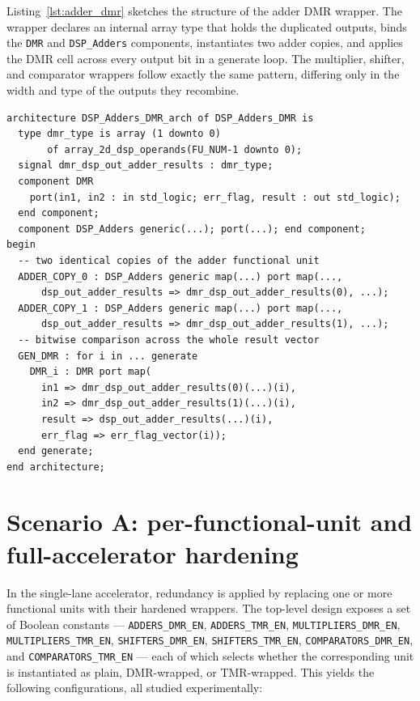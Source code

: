 Listing~\ref{lst:adder_dmr} sketches the structure of the adder DMR wrapper. The
wrapper declares an internal array type that holds the duplicated outputs, binds
the \texttt{DMR} and \texttt{DSP\_Adders} components, instantiates two adder
copies, and applies the DMR cell across every output bit in a generate loop. The
multiplier, shifter, and comparator wrappers follow exactly the same pattern,
differing only in the width and type of the outputs they recombine.

\begin{lstlisting}[language=myvhdl, caption={Structure of the adder DMR wrapper (abridged).}, label={lst:adder_dmr}]
architecture DSP_Adders_DMR_arch of DSP_Adders_DMR is
  type dmr_type is array (1 downto 0)
       of array_2d_dsp_operands(FU_NUM-1 downto 0);
  signal dmr_dsp_out_adder_results : dmr_type;
  component DMR
    port(in1, in2 : in std_logic; err_flag, result : out std_logic);
  end component;
  component DSP_Adders generic(...); port(...); end component;
begin
  -- two identical copies of the adder functional unit
  ADDER_COPY_0 : DSP_Adders generic map(...) port map(...,
      dsp_out_adder_results => dmr_dsp_out_adder_results(0), ...);
  ADDER_COPY_1 : DSP_Adders generic map(...) port map(...,
      dsp_out_adder_results => dmr_dsp_out_adder_results(1), ...);
  -- bitwise comparison across the whole result vector
  GEN_DMR : for i in ... generate
    DMR_i : DMR port map(
      in1 => dmr_dsp_out_adder_results(0)(...)(i),
      in2 => dmr_dsp_out_adder_results(1)(...)(i),
      result => dsp_out_adder_results(...)(i),
      err_flag => err_flag_vector(i));
  end generate;
end architecture;
\end{lstlisting}

\section{Scenario A: per-functional-unit and full-accelerator hardening}
\label{sec:ft-scenarioB}

In the single-lane accelerator, redundancy is applied by replacing one or more
functional units with their hardened wrappers. The top-level design exposes a
set of Boolean constants --- \texttt{ADDERS\_DMR\_EN}, \texttt{ADDERS\_TMR\_EN},
\texttt{MULTIPLIERS\_DMR\_EN}, \texttt{MULTIPLIERS\_TMR\_EN},
\texttt{SHIFTERS\_DMR\_EN}, \texttt{SHIFTERS\_TMR\_EN},
\texttt{COMPARATORS\_DMR\_EN}, and \texttt{COMPARATORS\_TMR\_EN} --- each of which
selects whether the corresponding unit is instantiated as plain, DMR-wrapped, or
TMR-wrapped. This yields the following configurations, all studied
experimentally:

